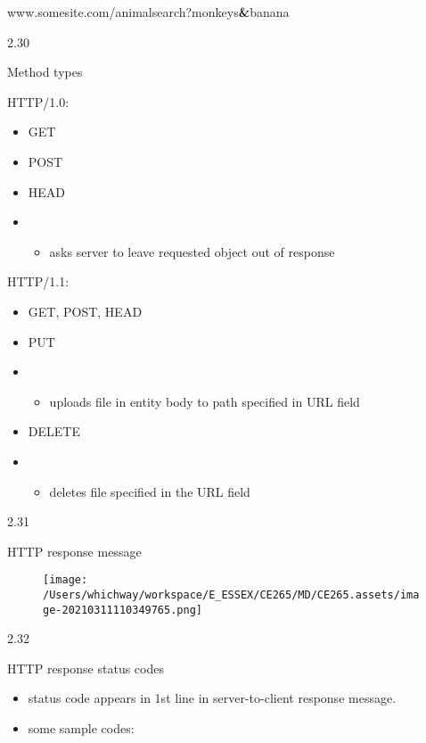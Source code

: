 \documentclass[
]{article}
\newenvironment{Shaded}{}{}
\newcommand{\ErrorTok}[1]{\textcolor[rgb]{1.00,0.00,0.00}{\textbf{#1}}}
\newcommand{\NormalTok}[1]{#1}
\begin{document}
\begin{Shaded}
\begin{Highlighting}[]
\NormalTok{www.somesite.com/animalsearch?monkeys}\ErrorTok{\&}\NormalTok{banana}
\end{Highlighting}
\end{Shaded}

2.30

Method types

HTTP/1.0:

\begin{itemize}
\item
  GET
\item
  POST
\item
  HEAD
\item
  \begin{itemize}
  \item
    asks server to leave requested object out of response
  \end{itemize}
\end{itemize}

HTTP/1.1:

\begin{itemize}
\item
  GET, POST, HEAD
\item
  PUT
\item
  \begin{itemize}
  \item
    uploads file in entity body to path specified in URL field
  \end{itemize}
\item
  DELETE
\item
  \begin{itemize}
  \item
    deletes file specified in the URL field
  \end{itemize}
\end{itemize}

2.31

HTTP response message

\begin{figure}
\centering
\texttt{[image: /Users/whichway/workspace/E\_ESSEX/CE265/MD/CE265.assets/image-20210311110349765.png]}
\caption{}
\end{figure}

2.32

HTTP response status codes

\begin{itemize}
\item
  status code appears in 1st line in server-to-client response message.
\item
  some sample codes:
\end{itemize}
\end{document}
